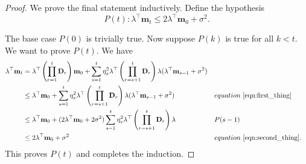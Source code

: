\documentclass{article}
\def\m{{\mathbf{m}}}
\def\D{{\mathbf{D}}}
\def\eqref#1{equation~\ref{#1}}
\def\m{{\mathbf{m}}}
\def\D{{\mathbf{D}}}
\theoremstyle{plain}
\def\m{{\mathbf{m}}}
\begin{document}
\begin{proof}
    We prove the final statement inductively. Define the hypothesis
    \[
    P(t):
    \lambda^\top \m_t
    \leq
    2\lambda^\top \m_0 + \sigma^2.
    \]

    The base case $P(0)$ is trivially true. Now suppose $P(k)$ is true
    for all $k<t$. We want to prove $P(t)$. We have
    \begin{align*}
        \lambda^\top \m_t
        &=
        \lambda^\top
        \left(\prod_{r=1}^t \D_r\right)\m_0
        +
        \sum_{s=1}^t
        \eta_s^2
        \lambda^\top
        \left(\prod_{r=s+1}^t \D_r\right)
        \lambda
        (\lambda^\top \m_{s-1}+\sigma^2)
        \\
        &\leq
        \lambda^\top \m_0
        +
        \sum_{s=1}^t
        \eta_s^2
        \lambda^\top
        \left(\prod_{r=s+1}^t \D_r\right)
        \lambda
        (\lambda^\top \m_{s-1}+\sigma^2)
        && \eqref{eqn:first_thing}
        \\
        &\leq
        \lambda^\top \m_0
        +
        (2\lambda^\top \m_0+2\sigma^2)
        \sum_{s=1}^t
        \eta_s^2
        \lambda^\top
        \left(\prod_{r=s+1}^t \D_r\right)
        \lambda
        && P(s-1)
        \\
        &\leq
        2\lambda^\top \m_0+\sigma^2
        && \eqref{eqn:second_thing}.
    \end{align*}
    This proves $P(t)$ and completes the induction.
\end{proof}
\end{document}
